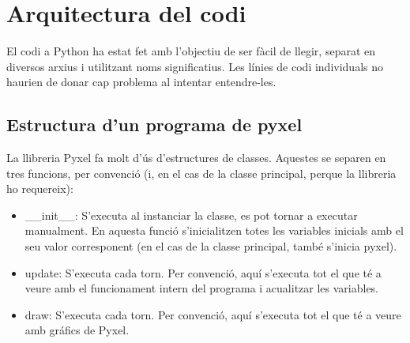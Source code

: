 \section{Arquitectura del codi}
El codi a Python ha estat fet amb l'objectiu de ser f\`acil de llegir,
separat en diversos arxius i utilitzant noms significatius.
Les l\'inies de codi individuals no haurien de
donar cap problema al intentar entendre-les.


\subsection*{Estructura d'un programa de pyxel}
La llibreria Pyxel fa molt d'\'us d'estructures de classes.
Aquestes se separen en tres funcions, per convenci\'o
(i, en el cas de la classe principal, perque la llibreria ho requereix):

\begin{itemize}
\item{\_\_init\_\_:
	S'executa al instanciar la classe, es pot tornar a executar manualment.
	En aquesta funci\'o s'inicialitzen totes les variables inicials amb el seu valor corresponent
	(en el cas de la classe principal, tamb\'e s'inicia pyxel).
	}
\item{update:
	S'executa cada torn. 
	Per convenci\'o, aqu\'i s'executa tot el que t\'e a veure amb
	el funcionament intern del programa i acualitzar les variables.
	}
\item{draw:
	S'executa cada torn.
	Per convenci\'o, aqu\'i s'executa tot el que t\'e a veure amb
	gr\'afics de Pyxel.
}
\end{itemize}

